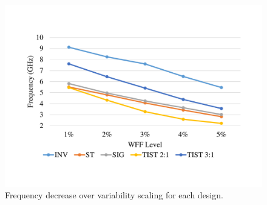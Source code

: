 \documentclass[pgmicro,mestrado,english]{iiufrgs}
\begin{document}
\begin{figure}[]
\centering
\includegraphics[width=\textwidth, trim={2cm 3cm 2cm 3cm},clip]{freqRetWFF.pdf}
\caption{Frequency decrease over variability scaling for each design.}
\label{fig:freqRetWFF}
\end{figure}




\end{document}
